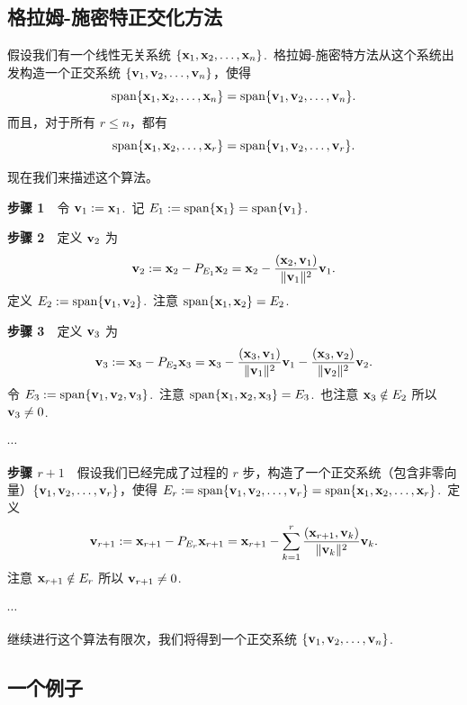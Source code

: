 \subsection{格拉姆-施密特正交化方法}\label{sec:05-03-01}

假设我们有一个线性无关系统 $\{\xx_1, \xx_2, \dots, \xx_n\}$.~格拉姆-施密特方法从这个系统出发构造一个正交系统 $\{\vv_1, \vv_2, \dots, \vv_n\}$，使得
$$\spanL\{\xx_1, \xx_2, \dots, \xx_n\} = \spanL\{\vv_1, \vv_2, \dots, \vv_n\}.$$
而且，对于所有 $r \leq n$，都有
$$\spanL\{\xx_1, \xx_2, \dots, \xx_r\} = \spanL\{\vv_1, \vv_2, \dots, \vv_r\}.$$

现在我们来描述这个算法。

\textbf{步骤 1}~~令 $\vv_1 := \xx_1$.~记 $E_1 := \spanL\{\xx_1\} = \spanL\{\vv_1\}$.

\textbf{步骤 2}~~定义 $\vv_2$ 为
$$\vv_2 := \xx_2 - P_{E_1} \xx_2 = \xx_2 - \frac{(\xx_2, \vv_1)}{\|\vv_1\|^2} \vv_1.$$
定义 $E_2 := \spanL\{\vv_1, \vv_2\}$.~注意 $\spanL\{\xx_1, \xx_2\} = E_2$.~

\textbf{步骤 3}~~定义 $\vv_3$ 为
$$\vv_3 := \xx_3 - P_{E_2} \xx_3 = \xx_3 - \frac{(\xx_3, \vv_1)}{\|\vv_1\|^2} \vv_1 - \frac{(\xx_3, \vv_2)}{\|\vv_2\|^2} \vv_2.$$
令 $E_3 := \spanL\{\vv_1, \vv_2, \vv_3\}$.~注意 $\spanL\{\xx_1, \xx_2, \xx_3\} = E_3$.~也注意 $\xx_3 \notin E_2$ 所以 $\vv_3 \neq 0$.~

$\cdots$

\textbf{步骤 $r+1$}~~假设我们已经完成了过程的 $r$ 步，构造了一个正交系统（包含非零向量）$\{\vv_1, \vv_2, \dots, \vv_r\}$，使得 $E_r := \spanL\{\vv_1, \vv_2, \dots, \vv_r\} = \spanL\{\xx_1, \xx_2, \dots, \xx_r\}$.~定义
$$\vv_{r+1} := \xx_{r+1} - P_{E_r} \xx_{r+1} = \xx_{r+1} - \sum_{k=1}^r \frac{(\xx_{r+1}, \vv_k)}{\|\vv_k\|^2} \vv_k.$$
注意 $\xx_{r+1} \notin E_r$ 所以 $\vv_{r+1} \neq 0$.~

$\cdots$

继续进行这个算法有限次，我们将得到一个正交系统 $\{\vv_1, \vv_2, \dots, \vv_n\}$.~

\subsection{一个例子}\label{sec:05-03-02}

